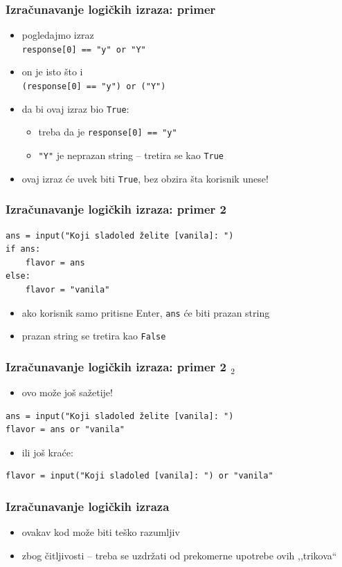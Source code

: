 \documentclass[utf8,compress]{beamer}
\begin{document}
\begin{frame}[fragile]
  \frametitle{Izračunavanje logičkih izraza: primer}
  \begin{itemize}
    \item pogledajmo izraz \\
      \texttt{response[0] == "y" or "Y"}
    \item on je isto što i \\
      \texttt{(response[0] == "y") or ("Y")}
    \item da bi ovaj izraz bio \texttt{True}:
    \begin{itemize}
      \item treba da je \texttt{response[0] == "y"}
      \item \texttt{"Y"} je neprazan string -- tretira se kao \texttt{True}
    \end{itemize}
    \item ovaj izraz će uvek biti \texttt{True}, bez obzira šta korisnik unese!
  \end{itemize}
\end{frame}

\begin{frame}[fragile]
  \frametitle{Izračunavanje logičkih izraza: primer 2}
\begin{verbatim}
ans = input("Koji sladoled želite [vanila]: ")
if ans:
    flavor = ans
else:
    flavor = "vanila"
\end{verbatim}
  \begin{itemize}
    \item ako korisnik samo pritisne Enter, \texttt{ans} će biti prazan string
    \item prazan string se tretira kao \texttt{False}
  \end{itemize}
\end{frame}

\begin{frame}[fragile,shrink=5]
  \frametitle{Izračunavanje logičkih izraza: primer 2 $_2$}
  \begin{itemize}
    \item ovo može još sažetije!
  \end{itemize}
\begin{verbatim}
ans = input("Koji sladoled želite [vanila]: ")
flavor = ans or "vanila"
\end{verbatim}
  \begin{itemize}
    \item ili još kraće:
  \end{itemize}
\begin{verbatim}
flavor = input("Koji sladoled [vanila]: ") or "vanila"
\end{verbatim}
\end{frame}

\begin{frame}[fragile]
  \frametitle{Izračunavanje logičkih izraza}
  \begin{itemize}
    \item ovakav kod može biti teško razumljiv
    \item zbog čitljivosti -- treba se uzdržati od prekomerne upotrebe ovih ,,trikova``
  \end{itemize}
\end{frame}
\end{document}
